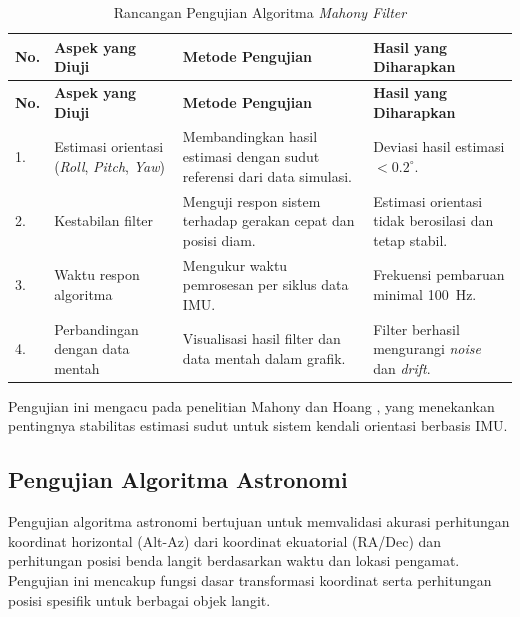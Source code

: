 \begin{longtable}{|b{}|p{}|p{}|p{}|}
	\caption{Rancangan Pengujian Algoritma \textit{Mahony Filter}}
	\label{table:3.ujiMahony}\\
	\hline
	\textbf{No.} & \textbf{Aspek yang Diuji} & \textbf{Metode Pengujian} & \textbf{Hasil yang Diharapkan} \\
	\hline
	\endfirsthead
	\hline
	\textbf{No.} & \textbf{Aspek yang Diuji} & \textbf{Metode Pengujian} & \textbf{Hasil yang Diharapkan} \\
	\hline
	\endhead
	
	1. & Estimasi orientasi (\textit{Roll}, \textit{Pitch}, \textit{Yaw}) & Membandingkan hasil estimasi dengan sudut referensi dari data simulasi. & Deviasi hasil estimasi $< 0.2^\circ$. \\
	\hline
	2. & Kestabilan filter & Menguji respon sistem terhadap gerakan cepat dan posisi diam. & Estimasi orientasi tidak berosilasi dan tetap stabil. \\
	\hline
	3. & Waktu respon algoritma & Mengukur waktu pemrosesan per siklus data IMU. & Frekuensi pembaruan minimal 100~Hz. \\
	\hline
	4. & Perbandingan dengan data mentah & Visualisasi hasil filter dan data mentah dalam grafik. & Filter berhasil mengurangi \textit{noise} dan \textit{drift}. \\
	\hline
\end{longtable}

Pengujian ini mengacu pada penelitian Mahony \cite{Mahony2008} dan Hoang \cite{MinhLongHoang2022}, yang menekankan pentingnya stabilitas estimasi sudut untuk sistem kendali orientasi berbasis IMU.

\subsection{Pengujian Algoritma Astronomi}
Pengujian algoritma astronomi bertujuan untuk memvalidasi akurasi perhitungan koordinat horizontal (Alt-Az) dari koordinat ekuatorial (RA/Dec) dan perhitungan posisi benda langit berdasarkan waktu dan lokasi pengamat. Pengujian ini mencakup fungsi dasar transformasi koordinat serta perhitungan posisi spesifik untuk berbagai objek langit. \par

